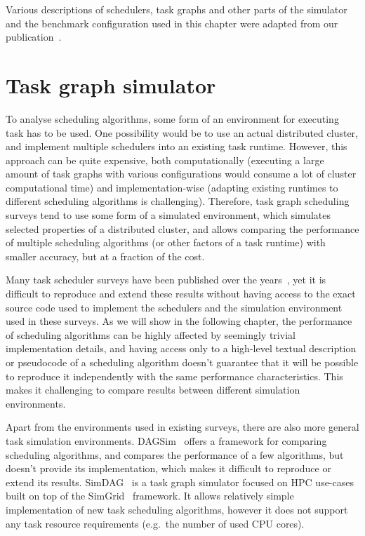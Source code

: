 Various descriptions of schedulers, task graphs and other parts of the simulator and the benchmark
configuration used in this chapter were adapted from our publication~\cite{estee}.


\section{Task graph simulator}
\label{sec:estee-simulator}
To analyse scheduling algorithms, some form of an environment for executing task has to be used.
One possibility would be to use an actual distributed cluster, and implement multiple schedulers
into an existing task runtime. However, this approach can be quite expensive, both computationally
(executing a large amount of task graphs with various configurations would consume a lot of cluster
computational time) and implementation-wise (adapting existing runtimes to different scheduling
algorithms is challenging). Therefore, task graph scheduling surveys tend to use some form of a
simulated environment, which simulates selected properties of a distributed cluster, and allows
comparing the performance of multiple scheduling algorithms (or other factors of a task runtime)
with smaller accuracy, but at a fraction of the  cost.

Many task scheduler surveys have been published over the years~\cite{hlfet1974, kwok1998benchmarking, hagras2003static, sinnen2005, wang2018list}, yet it is
difficult to reproduce and extend these results without having access to the exact source code used
to implement the schedulers and the simulation environment used in these surveys. As we will show
in the following chapter, the performance of scheduling algorithms can be highly affected by
seemingly trivial implementation details, and having access only to a high-level textual
description or pseudocode of a scheduling algorithm doesn't guarantee that it will be possible to
reproduce it independently with the same performance characteristics. This makes it challenging to
compare results between different simulation environments.

Apart from the environments used in existing surveys, there are also more general task simulation
environments. DAGSim~\cite{dagsim} offers a framework for comparing scheduling algorithms,
and compares the performance of a few algorithms, but doesn't provide its implementation, which
makes it difficult to reproduce or extend its results. SimDAG~\cite{simdag} is a task
graph simulator focused on HPC use-cases built on top of the SimGrid~\cite{simgrid}
framework. It allows relatively simple implementation of new task scheduling algorithms, however it
does not support any task resource requirements (e.g.\ the number of used CPU cores).

